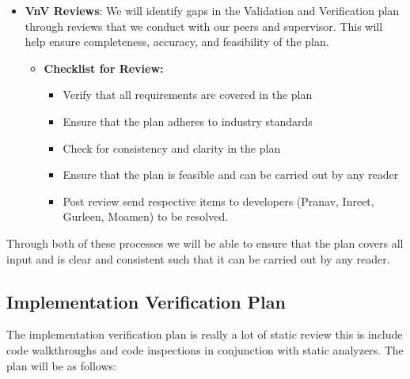\documentclass[12pt, titlepage]{article}
\begin{document}
\begin{itemize}
  \item \textbf{VnV Reviews}: We will identify gaps in the Validation and Verification plan through reviews that we conduct with our peers and supervisor. This will help ensure completeness, accuracy, and feasibility of the plan.
    \begin{itemize}
      \item \textbf{Checklist for Review:}
      \begin{itemize}
        \item Verify that all requirements are covered in the plan
        \item Ensure that the plan adheres to industry standards
        \item Check for consistency and clarity in the plan
        \item Ensure that the plan is feasible and can be carried out by any reader
        \item Post review send respective items to developers (Pranav, Inreet, Gurleen, Moamen) to be resolved.
      \end{itemize}
    \end{itemize}

\end{itemize}

Through both of these processes we will be able to ensure that the plan covers all input and is clear and consistent such that it can be carried out by any reader.

\subsection{Implementation Verification Plan} \label{section:3.5}


The implementation verification plan is really a lot of static review this is include code walkthroughs and code inspections in conjunction with static analyzers. The plan will be as follows:
\end{document}
